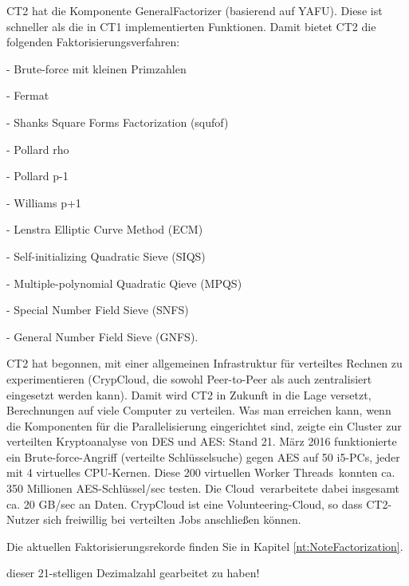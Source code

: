 \begin{refsegment}
{   CT2 hat die Komponente GeneralFactorizer
  (basierend auf YAFU). Diese ist schneller als die in CT1
  implementierten Funktionen.
  Damit bietet CT2 die folgenden Faktorisierungsverfahren:
  \begin{compactitem}
   \item[-] Brute-force mit kleinen Primzahlen
   \item[-] Fermat
   \item[-] Shanks Square Forms Factorization (squfof)
   \item[-] Pollard rho
   \item[-] Pollard p-1
   \item[-] Williams p+1
   \item[-] Lenstra Elliptic Curve Method (ECM)
   \item[-] Self-initializing Quadratic Sieve (SIQS)
   \item[-] Multiple-polynomial Quadratic Qieve (MPQS)
   \item[-] Special Number Field Sieve (SNFS)
   \item[-] General Number Field Sieve (GNFS).
  \end{compactitem}

   CT2 hat begonnen, mit einer allgemeinen Infrastruktur für verteiltes
  Rechnen zu experimentieren (CrypCloud, die sowohl Peer-to-Peer
  als auch zentralisiert eingesetzt werden kann). Damit wird CT2 in Zukunft in die
  Lage versetzt, Berechnungen auf viele Computer zu verteilen.
  Was man erreichen kann, wenn die Komponenten für die Parallelisierung eingerichtet
  sind, zeigte ein Cluster zur verteilten Kryptoanalyse von DES und AES:
  Stand 21. März 2016 funktionierte ein Brute-force-Angriff (verteilte Schlüsselsuche)
  gegen AES auf 50 i5-PCs, jeder mit 4 virtuelles CPU-Kernen. Diese 200 virtuellen
  \glqq Worker Threads\grqq~konnten ca. 350 Millionen AES-Schlüssel/sec testen. Die
  \glqq Cloud\grqq~verarbeitete dabei insgesamt ca. 20 GB/sec an Daten. CrypCloud
  ist eine Volunteering-Cloud, so dass CT2-Nutzer sich freiwillig bei
  verteilten Jobs anschließen können.

   Die aktuellen Faktorisierungsrekorde finden Sie in Kapitel
  \ref{nt:NoteFactorization}.
}
dieser 21-stelligen Dezimalzahl gearbeitet zu haben!


\end{refsegment}
